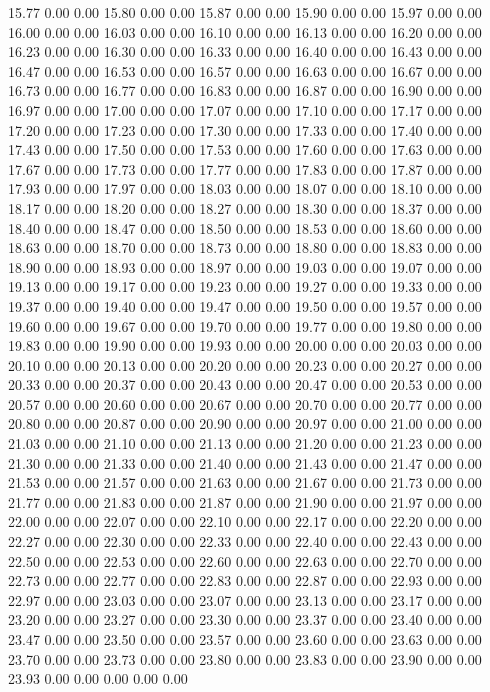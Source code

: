 {15.77 0.00 0.00
15.80 0.00 0.00
15.87 0.00 0.00
15.90 0.00 0.00
15.97 0.00 0.00
16.00 0.00 0.00
16.03 0.00 0.00
16.10 0.00 0.00
16.13 0.00 0.00
16.20 0.00 0.00
16.23 0.00 0.00
16.30 0.00 0.00
16.33 0.00 0.00
16.40 0.00 0.00
16.43 0.00 0.00
16.47 0.00 0.00
16.53 0.00 0.00
16.57 0.00 0.00
16.63 0.00 0.00
16.67 0.00 0.00
16.73 0.00 0.00
16.77 0.00 0.00
16.83 0.00 0.00
16.87 0.00 0.00
16.90 0.00 0.00
16.97 0.00 0.00
17.00 0.00 0.00
17.07 0.00 0.00
17.10 0.00 0.00
17.17 0.00 0.00
17.20 0.00 0.00
17.23 0.00 0.00
17.30 0.00 0.00
17.33 0.00 0.00
17.40 0.00 0.00
17.43 0.00 0.00
17.50 0.00 0.00
17.53 0.00 0.00
17.60 0.00 0.00
17.63 0.00 0.00
17.67 0.00 0.00
17.73 0.00 0.00
17.77 0.00 0.00
17.83 0.00 0.00
17.87 0.00 0.00
17.93 0.00 0.00
17.97 0.00 0.00
18.03 0.00 0.00
18.07 0.00 0.00
18.10 0.00 0.00
18.17 0.00 0.00
18.20 0.00 0.00
18.27 0.00 0.00
18.30 0.00 0.00
18.37 0.00 0.00
18.40 0.00 0.00
18.47 0.00 0.00
18.50 0.00 0.00
18.53 0.00 0.00
18.60 0.00 0.00
18.63 0.00 0.00
18.70 0.00 0.00
18.73 0.00 0.00
18.80 0.00 0.00
18.83 0.00 0.00
18.90 0.00 0.00
18.93 0.00 0.00
18.97 0.00 0.00
19.03 0.00 0.00
19.07 0.00 0.00
19.13 0.00 0.00
19.17 0.00 0.00
19.23 0.00 0.00
19.27 0.00 0.00
19.33 0.00 0.00
19.37 0.00 0.00
19.40 0.00 0.00
19.47 0.00 0.00
19.50 0.00 0.00
19.57 0.00 0.00
19.60 0.00 0.00
19.67 0.00 0.00
19.70 0.00 0.00
19.77 0.00 0.00
19.80 0.00 0.00
19.83 0.00 0.00
19.90 0.00 0.00
19.93 0.00 0.00
20.00 0.00 0.00
20.03 0.00 0.00
20.10 0.00 0.00
20.13 0.00 0.00
20.20 0.00 0.00
20.23 0.00 0.00
20.27 0.00 0.00
20.33 0.00 0.00
20.37 0.00 0.00
20.43 0.00 0.00
20.47 0.00 0.00
20.53 0.00 0.00
20.57 0.00 0.00
20.60 0.00 0.00
20.67 0.00 0.00
20.70 0.00 0.00
20.77 0.00 0.00
20.80 0.00 0.00
20.87 0.00 0.00
20.90 0.00 0.00
20.97 0.00 0.00
21.00 0.00 0.00
21.03 0.00 0.00
21.10 0.00 0.00
21.13 0.00 0.00
21.20 0.00 0.00
21.23 0.00 0.00
21.30 0.00 0.00
21.33 0.00 0.00
21.40 0.00 0.00
21.43 0.00 0.00
21.47 0.00 0.00
21.53 0.00 0.00
21.57 0.00 0.00
21.63 0.00 0.00
21.67 0.00 0.00
21.73 0.00 0.00
21.77 0.00 0.00
21.83 0.00 0.00
21.87 0.00 0.00
21.90 0.00 0.00
21.97 0.00 0.00
22.00 0.00 0.00
22.07 0.00 0.00
22.10 0.00 0.00
22.17 0.00 0.00
22.20 0.00 0.00
22.27 0.00 0.00
22.30 0.00 0.00
22.33 0.00 0.00
22.40 0.00 0.00
22.43 0.00 0.00
22.50 0.00 0.00
22.53 0.00 0.00
22.60 0.00 0.00
22.63 0.00 0.00
22.70 0.00 0.00
22.73 0.00 0.00
22.77 0.00 0.00
22.83 0.00 0.00
22.87 0.00 0.00
22.93 0.00 0.00
22.97 0.00 0.00
23.03 0.00 0.00
23.07 0.00 0.00
23.13 0.00 0.00
23.17 0.00 0.00
23.20 0.00 0.00
23.27 0.00 0.00
23.30 0.00 0.00
23.37 0.00 0.00
23.40 0.00 0.00
23.47 0.00 0.00
23.50 0.00 0.00
23.57 0.00 0.00
23.60 0.00 0.00
23.63 0.00 0.00
23.70 0.00 0.00
23.73 0.00 0.00
23.80 0.00 0.00
23.83 0.00 0.00
23.90 0.00 0.00
23.93 0.00 0.00
0.00 0.00 0.00
}\hidroData
